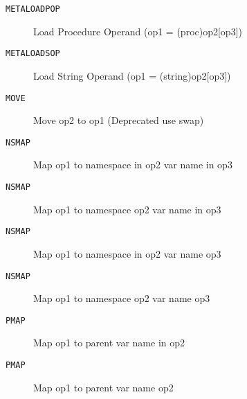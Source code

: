 
\begin{description}
\item[\texttt{METALOADPOP}]        Load Procedure Operand (op1 = (proc)op2[op3])\\
\end{description}

\begin{description}
\item[\texttt{METALOADSOP}]        Load String Operand (op1 = (string)op2[op3])\\
\end{description}

\begin{description}
\item[\texttt{MOVE       }]  Move op2 to op1 (Deprecated use swap)\\
\end{description}

\begin{description}
\item[\texttt{NSMAP      }]  Map op1 to namespace in op2 var name in op3\\
\end{description}

\begin{description}
\item[\texttt{NSMAP      }]  Map op1 to namespace op2 var name in op3\\
\end{description}

\begin{description}
\item[\texttt{NSMAP      }]  Map op1 to namespace in op2 var name op3\\
\end{description}

\begin{description}
\item[\texttt{NSMAP      }]  Map op1 to namespace op2 var name op3\\
\end{description}

\begin{description}
\item[\texttt{PMAP       }]  Map op1 to parent var name in op2\\
\end{description}

\begin{description}
\item[\texttt{PMAP       }]  Map op1 to parent var name op2\\
\end{description}
